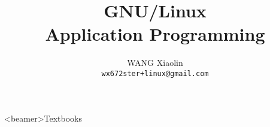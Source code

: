 \usepackage{wx672tut}

\newcommand{\unix}{{\fontspec{Purisa}{UNIX}}}
\newcommand{\emacs}{\texttt{[image: emacs]}}
\newcommand{\google}{\raisebox{-.2em}{\texttt{[image: google]}}}
\newcommand{\GG}{\textcolor{SkyBlue}{\nerd }}
\newcommand{\world}{\textcolor{SkyBlue}{\nerd }}
\newcommand{\pdf}{\textcolor{red}{\nerd }}%
\newcommand{\folder}{{\nerd }}%
\newcommand{\git}{{\nerd }}%
\newcommand{\github}{\nerd }
\newcommand{\moodle}{\texttt{[image: moodle]}}
\newcommand{\obook}{{\nerd }}%
\newcommand{\shell}{{\nerd }}%
\newcommand{\CMD}[1]{\texttt{\textcolor{Green}{\$} #1}}
\newcommand{\cmd}[1]{\texttt{#1}}
\newcommand{\vim}{{\nerd }}
\newcommand{\stackoverflow}{{\nerd }}%
\newcommand{\correct}{{\Large\textcolor{Green}{\nerd ✔}}}
\newcommand{\wrong}{\textcolor{red}{\nerd ✘}}
\newcommand{\Bad}{{\Large \textcolor{red}{\bad}}}
\newcommand{\Good}{{\Large \textcolor{Green}{\good}}}






\title{GNU/Linux\\Application Programming}
\author{WANG Xiaolin\\%
  {\footnotesize\texttt{wx672ster+linux@gmail.com}}}





\begin{frame}<beamer>{Textbooks}
  \begin{refsection}
    \nocite{matthew2008beginning, cooper10bash, raymond2003art, stevens2013advanced,
      Love:2007:LSP:1205435, Kerrisk:2010:LPI:1869911, Bryant2010computersystems}%
    \printbibliography[heading=none]
  \end{refsection}
\end{frame}

